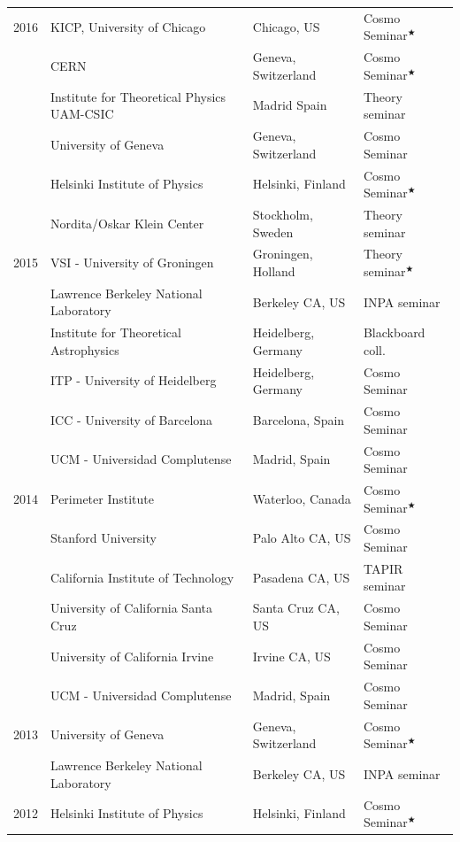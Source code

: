 \documentclass[11pt,a4paper]{article}
\begin{document}
\begin{longtable}{l p{} p{3.5cm} p{3cm}}
\\[2pt] 2016  & {KICP, University of Chicago} & Chicago, US & Cosmo Seminar$^\bigstar$ \\   
      & {CERN} & Geneva, Switzerland & Cosmo Seminar$^\bigstar$ \\ 
    & {Institute for Theoretical Physics UAM-CSIC} & Madrid Spain & Theory seminar \\
    & {University of Geneva} & Geneva, Switzerland & Cosmo Seminar \\
    & {Helsinki Institute of Physics} & Helsinki, Finland & Cosmo Seminar$^\bigstar$ \\
    & {Nordita/Oskar Klein Center} & Stockholm, Sweden & Theory seminar 
\\[2pt] 2015 & {VSI - University of Groningen} & Groningen, Holland & Theory seminar$^\bigstar$ \\  
& {Lawrence Berkeley National Laboratory} & Berkeley CA, US & INPA seminar \\
    & {Institute for Theoretical Astrophysics} & Heidelberg, Germany & Blackboard coll. \\
    & {ITP - University of Heidelberg} & Heidelberg, Germany & Cosmo Seminar \\
  & {ICC - University of Barcelona} & Barcelona, Spain & Cosmo Seminar \\
  & {UCM - Universidad Complutense} & Madrid, Spain & Cosmo Seminar 
  \\[2pt] 2014 
& {Perimeter Institute} & Waterloo, Canada & Cosmo Seminar$^\bigstar$ \\
& {Stanford University} & Palo Alto CA, US & Cosmo Seminar \\ 
  & {California Institute of Technology} & Pasadena CA, US & TAPIR seminar \\ 
  & {University of California Santa Cruz} & Santa Cruz CA, US & Cosmo Seminar \\ 
  & {University of California Irvine} & Irvine CA, US & Cosmo Seminar \\ 
  & {UCM - Universidad Complutense} & Madrid, Spain & Cosmo Seminar 
\\[2pt] 2013
& {University of Geneva} & Geneva, Switzerland & Cosmo Seminar$^\bigstar$ \\ 
 & {Lawrence Berkeley National Laboratory} & Berkeley CA, US & INPA seminar 
\\[2pt] 2012 
& {Helsinki Institute of Physics} & Helsinki, Finland & Cosmo Seminar$^\bigstar$ \\ 

\end{longtable}
\end{document}
